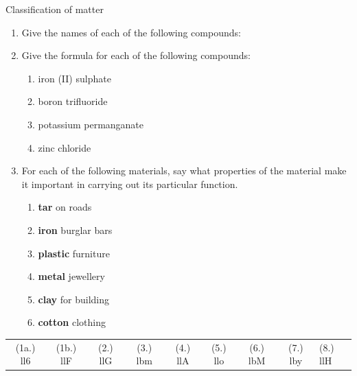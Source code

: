 \begin{eocexercises}{Classification of matter }
{\begin{enumerate}[noitemsep, label=\textbf{\arabic*}. ]
\begin{enumerate}[noitemsep, label=\textbf{\alph*}. ]
\end{enumerate}
\label{m38706*uid153}\item Give the names of each of the following compounds:
\label{m38706*id68358}\begin{enumerate}[noitemsep, label=\textbf{\alph*}. ] 
            \label{m38706*uid154}\item $\text{NaBr}$
\label{m38706*uid155}\item ${\text{Ba}(\text{NO}}}_{2})_2$
\label{m38706*uid156}\item ${\text{SO}}_{2}$ 
\item $\text{H}_{2}\text{SO}_{4}$
\end{enumerate}
\item Give the formula for each of the following compounds:
\begin{enumerate}[noitemsep, label=\textbf{\alph*}.]
 \item iron (II) sulphate
\item boron trifluoride
\item potassium permanganate
\item zinc chloride
\end{enumerate}

\label{m38706*uid157}\item For each of the following materials, say what properties of the material make it important in carrying out its particular function.
\label{m38706*id68436}\begin{enumerate}[noitemsep, label=\textbf{\alph*}. ] 
            \label{m38706*uid158}\item \textbf{tar} on roads
\label{m38706*uid159}\item \textbf{iron} burglar bars
\label{m38706*uid160}\item \textbf{plastic} furniture
\label{m38706*uid161}\item \textbf{metal} jewellery
\label{m38706*uid162}\item \textbf{clay} for building
\label{m38706*uid163}\item \textbf{cotton} clothing
\end{enumerate}
\end{enumerate}
\practiceinfo
  \label{m38706**end}
  \label{09a7a4809656be0b739ee130746cd803**end}
\par 
 \par \begin{tabular}[h]{cccccccc}
 (1a.) ll6 & (1b.) llF &  (2.) llG  &  (3.) lbm  &  (4.) llA  &  (5.) llo  &  (6.) lbM  &  (7.) lby  &  (8.) llH  & \end{tabular}}
\end{eocexercises}

